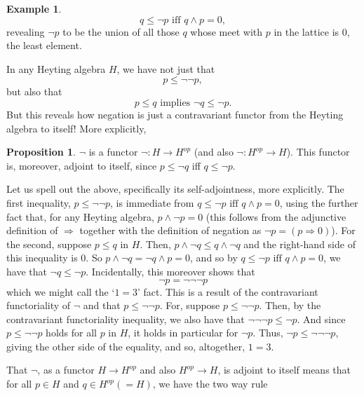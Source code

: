 \documentclass[11pt]{book}
\theoremstyle{definition}
\newtheorem{example}{Example}[section]
\theoremstyle{definition}
\theoremstyle{definition}
\newtheorem{proposition}{Proposition}[section]
\theoremstyle{theorem}
\theoremstyle{definition}
\begin{document}
\begin{example}
	\begin{equation*}
	q \leq \neg p \text{ iff } q \wedge p = 0,
	\end{equation*}
	revealing $\neg p$ to be the union of all those $q$ whose meet with $p$ in the lattice is $0$, the least element. \par 
	In any Heyting algebra $H$, we have not just that 
	\begin{equation*}
	p \leq \neg \neg p,
	\end{equation*}
	but also that 
	\begin{equation*}
	p \leq q \text{ implies } \neg q \leq \neg p.
	\end{equation*} 
	But this reveals how negation is just a contravariant functor from the Heyting algebra to itself! More explicitly, 
	\begin{proposition} 
		$\neg$ is a functor $\neg: H \rightarrow H^{op}$ (and also $\neg: H^{op} \rightarrow H$). This functor is, moreover, adjoint to itself, since $p \leq \neg q$ iff $q \leq \neg p$. 
	\end{proposition} \noindent 
Let us spell out the above, specifically its self-adjointness, more explicitly. The first inequality, $p \leq \neg \neg p$, is immediate from $q \leq \neg p \text{ iff } q \wedge p = 0$, using the further fact that, for any Heyting algebra, $p \wedge \neg p = 0$ (this follows from the adjunctive definition of $\Rightarrow$ together with the definition of negation as $\neg p = (p \Rightarrow 0)$). For the second, suppose $p \leq q$ in $H$. Then, $p \wedge \neg q \leq q \wedge \neg q$ and the right-hand side of this inequality is $0$. So $p \wedge \neg q = \neg q \wedge p = 0$, and so by $q \leq \neg p \text{ iff } q \wedge p = 0$, we have that $\neg q \leq \neg p$. Incidentally, this moreover shows that
	\begin{equation*}
	\neg p = \neg \neg \neg p
	\end{equation*} which we might call the `$1 = 3$' fact. This is a result of the contravariant functoriality of $\neg$ and that $p \leq \neg \neg p$. For, suppose $p \leq \neg \neg p$. Then, by the contravariant functoriality inequality, we also have that $\neg \neg \neg p \leq \neg p$. And since $p \leq \neg \neg p$ holds for all $p$ in $H$, it holds in particular for $\neg p$. Thus, $\neg p \leq \neg \neg \neg p$, giving the other side of the equality, and so, altogether, $1 = 3$. \par 
	That $\neg$, as a functor $H \rightarrow H^{op}$ and also $H^{op} \rightarrow H$, is adjoint to itself means that for all $p \in H$ and $q \in H^{op} (= H)$, we have the two way rule 

\end{example}
\end{document}
